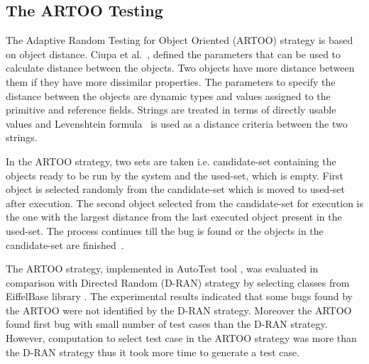 \subsection{The ARTOO Testing}
The Adaptive Random Testing for Object Oriented (ARTOO) strategy is based on object distance. Ciupa et al.~\cite{Ciupa2006}, defined the parameters that can be used to calculate distance between the objects. Two objects have more distance between them if they have more dissimilar properties. The parameters to specify the distance between the objects are dynamic types and values assigned to the primitive and reference fields. Strings are treated in terms of directly usable values and Levenshtein formula~\cite{Levenshtein1966} is used as a distance criteria between the two strings.

In the ARTOO strategy, two sets are taken i.e. candidate-set containing the objects ready to be run by the system and the used-set, which is empty. First object is selected randomly from the candidate-set which is moved to used-set after execution. The second object selected from the candidate-set for execution is the one with the largest distance from the last executed object present in the used-set. The process continues till the bug is found or the objects in the candidate-set are finished~\cite{Ciupa2006}.

The ARTOO strategy, implemented in AutoTest tool \cite{Ciupa2008a}, was evaluated in comparison with Directed Random (D-RAN) strategy by selecting classes from EiffelBase library \cite{meyer1987eiffel}. The experimental results indicated that some bugs found by the ARTOO were not identified by the D-RAN strategy. Moreover the ARTOO found first bug with small number of test cases than the D-RAN strategy. However, computation to select test case in the ARTOO strategy was more than the D-RAN strategy thus it took more time to generate a test case.

